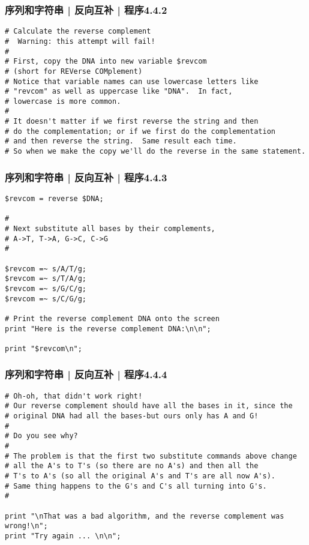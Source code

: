 \begin{frame}[fragile]
  \frametitle{序列和字符串 | 反向互补 | 程序4.4.2}
\begin{lstlisting}[firstnumber=12,basicstyle=\footnotesize\tt]
# Calculate the reverse complement
#  Warning: this attempt will fail!
#
# First, copy the DNA into new variable $revcom
# (short for REVerse COMplement)
# Notice that variable names can use lowercase letters like
# "revcom" as well as uppercase like "DNA".  In fact,
# lowercase is more common.
#
# It doesn't matter if we first reverse the string and then
# do the complementation; or if we first do the complementation
# and then reverse the string.  Same result each time.
# So when we make the copy we'll do the reverse in the same statement.
\end{lstlisting}
\end{frame}

\begin{frame}[fragile]
  \frametitle{序列和字符串 | 反向互补 | 程序4.4.3}
\begin{lstlisting}[firstnumber=27,basicstyle=\footnotesize\tt]
$revcom = reverse $DNA;

#
# Next substitute all bases by their complements,
# A->T, T->A, G->C, C->G
#

$revcom =~ s/A/T/g;
$revcom =~ s/T/A/g;
$revcom =~ s/G/C/g;
$revcom =~ s/C/G/g;

# Print the reverse complement DNA onto the screen
print "Here is the reverse complement DNA:\n\n";

print "$revcom\n";
\end{lstlisting}
\end{frame}

\begin{frame}[fragile]
  \frametitle{序列和字符串 | 反向互补 | 程序4.4.4}
\begin{lstlisting}[firstnumber=45,basicstyle=\scriptsize\tt]
# Oh-oh, that didn't work right!
# Our reverse complement should have all the bases in it, since the
# original DNA had all the bases-but ours only has A and G!
#
# Do you see why?
#
# The problem is that the first two substitute commands above change
# all the A's to T's (so there are no A's) and then all the
# T's to A's (so all the original A's and T's are all now A's).
# Same thing happens to the G's and C's all turning into G's.
#

print "\nThat was a bad algorithm, and the reverse complement was wrong!\n";
print "Try again ... \n\n";
\end{lstlisting}
\end{frame}

